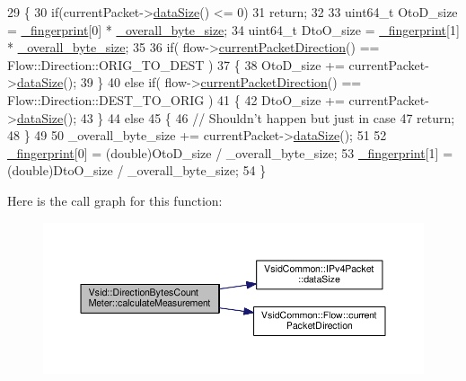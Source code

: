 \begin{DoxyCode}
29 \{
30     \textcolor{keywordflow}{if}(currentPacket->\hyperlink{class_vsid_common_1_1_i_pv4_packet_a39fe36210895625ee87320f5c0c7f52e}{dataSize}() <= 0)
31         \textcolor{keywordflow}{return};
32 
33     uint64\_t OtoD\_size = \hyperlink{class_vsid_1_1_attribute_meter_a0386b2fe9c5d6ab6fba16029d8da4efe}{\_fingerprint}[0] * \hyperlink{class_vsid_1_1_direction_bytes_count_meter_aabfb4d08acf97bcc1ac0f97b01fd9685}{\_overall\_byte\_size};
34     uint64\_t DtoO\_size = \hyperlink{class_vsid_1_1_attribute_meter_a0386b2fe9c5d6ab6fba16029d8da4efe}{\_fingerprint}[1] * \hyperlink{class_vsid_1_1_direction_bytes_count_meter_aabfb4d08acf97bcc1ac0f97b01fd9685}{\_overall\_byte\_size};
35 
36     \textcolor{keywordflow}{if}( flow->\hyperlink{class_vsid_common_1_1_flow_a0eb1c59e966ceb9ad6fee05d4c4784ad}{currentPacketDirection}() == Flow::Direction::ORIG\_TO\_DEST )
37     \{
38         OtoD\_size += currentPacket->\hyperlink{class_vsid_common_1_1_i_pv4_packet_a39fe36210895625ee87320f5c0c7f52e}{dataSize}();
39     \}
40     \textcolor{keywordflow}{else} \textcolor{keywordflow}{if}( flow->\hyperlink{class_vsid_common_1_1_flow_a0eb1c59e966ceb9ad6fee05d4c4784ad}{currentPacketDirection}() == Flow::Direction::DEST\_TO\_ORIG )
41     \{
42         DtoO\_size += currentPacket->\hyperlink{class_vsid_common_1_1_i_pv4_packet_a39fe36210895625ee87320f5c0c7f52e}{dataSize}();
43     \}
44     \textcolor{keywordflow}{else}
45     \{
46         \textcolor{comment}{// Shouldn't happen but just in case}
47         \textcolor{keywordflow}{return};
48     \}
49 
50     \_overall\_byte\_size += currentPacket->\hyperlink{class_vsid_common_1_1_i_pv4_packet_a39fe36210895625ee87320f5c0c7f52e}{dataSize}();
51 
52     \hyperlink{class_vsid_1_1_attribute_meter_a0386b2fe9c5d6ab6fba16029d8da4efe}{\_fingerprint}[0] = (double)OtoD\_size / \_overall\_byte\_size;
53     \hyperlink{class_vsid_1_1_attribute_meter_a0386b2fe9c5d6ab6fba16029d8da4efe}{\_fingerprint}[1] = (double)DtoO\_size / \_overall\_byte\_size;
54 \}\end{DoxyCode}


Here is the call graph for this function\-:
\nopagebreak
\begin{figure}[H]
\begin{center}
\leavevmode
\includegraphics[width=350pt]{class_vsid_1_1_direction_bytes_count_meter_a4768e6b91e25682668f49ed2f59b1bf5_cgraph}
\end{center}
\end{figure}


